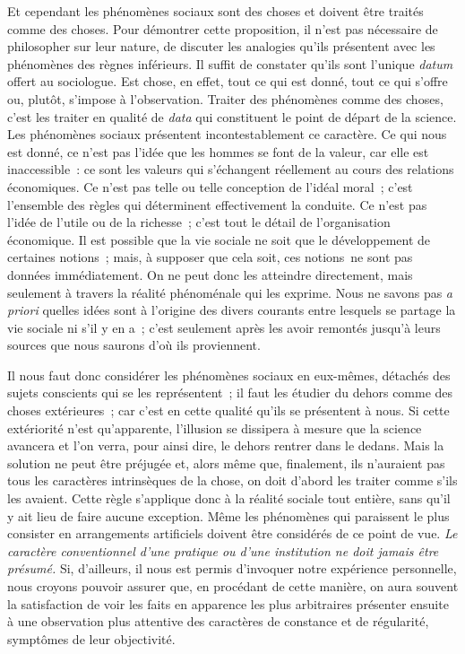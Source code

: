 \documentclass[french,twoside]{book} %
\begin{document}
\par
Et cependant les phénomènes sociaux sont des choses et doivent être traités comme des choses. Pour démontrer cette proposition, il n’est pas nécessaire de philosopher sur leur nature, de discuter les analogies qu’ils présentent avec les phénomènes des règnes inférieurs. Il suffit de constater qu’ils sont l’unique {\itshape datum} offert au sociologue. Est chose, en effet, tout ce qui est donné, tout ce qui s’offre ou, plutôt, s’impose à l’observation. Traiter des phénomènes comme des choses, c’est les traiter en qualité de {\itshape data} qui constituent le point de départ de la science. Les phénomènes sociaux présentent incontestablement ce caractère. Ce qui nous est donné, ce n’est pas l’idée que les hommes se font de la valeur, car elle est inaccessible : ce sont les valeurs qui s’échangent réellement au cours des relations économiques. Ce n’est pas telle ou telle conception de l’idéal moral ; c’est l’ensemble des règles qui déterminent effectivement la conduite. Ce n’est pas l’idée de l’utile ou de la richesse ; c’est tout le détail de l’organisation économique. Il est possible que la vie sociale ne soit que le développement de certaines notions ; mais, à supposer que cela soit, ces notions ne sont pas données immédiatement. On ne peut donc les atteindre directement, mais seulement à travers la réalité phénoménale qui les exprime. Nous ne savons pas {\itshape a priori} quelles idées sont à l’origine des divers courants entre lesquels se partage la vie sociale ni s’il y en a ; c’est seulement après les avoir remontés jusqu’à leurs sources que nous saurons d’où ils proviennent.\par
Il nous faut donc considérer les phénomènes sociaux en eux-mêmes, détachés des sujets conscients qui se les représentent ; il faut les étudier du dehors comme des choses extérieures ; car c’est en cette qualité qu’ils se présentent à nous. Si cette extériorité n’est qu’apparente, l’illusion se dissipera à mesure que la science avancera et l’on verra, pour ainsi dire, le dehors rentrer dans le dedans. Mais la solution ne peut être préjugée et, alors même que, finalement, ils n’auraient pas tous les caractères intrinsèques de la chose, on doit d’abord les traiter comme s’ils les avaient. Cette règle s’applique donc à la réalité sociale tout entière, sans qu’il y ait lieu de faire aucune exception. Même les phénomènes qui paraissent le plus consister en arrangements artificiels doivent être considérés de ce point de vue. {\itshape Le caractère conventionnel d’une pratique ou d’une institution ne doit jamais être présumé.} Si, d’ailleurs, il nous est permis d’invoquer notre expérience personnelle, nous croyons pouvoir assurer que, en procédant de cette manière, on aura souvent la satisfaction de voir les faits en apparence les plus arbitraires présenter ensuite à une observation plus attentive des caractères de constance et de régularité, symptômes de leur objectivité.\par
\end{document}
